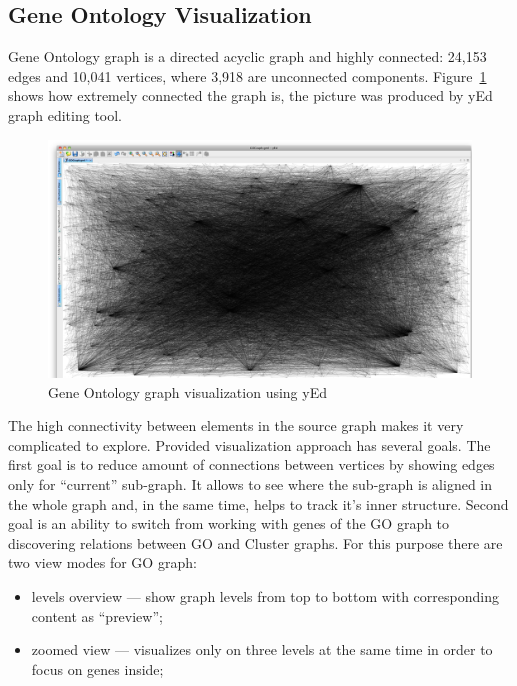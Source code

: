 \subsection{Gene Ontology Visualization}
\label{sec:go}

Gene Ontology graph is a directed acyclic graph and highly connected: 24,153 edges and 10,041 vertices, where 3,918 are unconnected components.
Figure~\ref{fig:go_connections_yEd} shows how extremely connected the graph is, the picture was produced by yEd graph editing tool.

\begin{figure}
\centering
\includegraphics[scale=0.2]{pictures/yEd_GO_2.png}
\caption{Gene Ontology graph visualization using yEd}
\label{fig:go_connections_yEd}
\end{figure}

The high connectivity between elements in the source graph makes it very complicated to explore. Provided visualization approach has several goals.
The first goal is to reduce amount of connections between vertices by showing edges only for ``current'' sub-graph.
It allows to see where the sub-graph is aligned in the whole graph and, in the same time, helps to track it's inner structure.
Second goal is an ability to switch from working with genes of the GO graph to discovering relations between GO and Cluster graphs.
For this purpose there are two view modes for GO graph:

\begin{itemize}
   \item levels overview --- show graph levels from top to bottom with corresponding content as ``preview'';
   \item zoomed view --- visualizes only on three levels at the same time in order to focus on genes inside;
\end{itemize}


